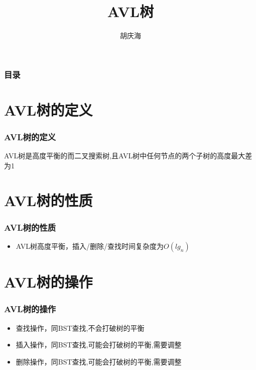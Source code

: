 \documentclass{beamer}
\begin{document}
\begin{CJK}{UTF8}{gbsn}     %

	\title{AVL树}
	\author{胡庆海}
	\date{}

    \begin{frame}
		\titlepage
    \end{frame}

    \begin{frame}
        \frametitle{目录}
		\tableofcontents
    \end{frame}

	\section{AVL树的定义}
	\begin{frame}
		\frametitle{AVL树的定义}
		AVL树是高度平衡的而二叉搜索树,且AVL树中任何节点的两个子树的高度最大差为1
	\end{frame}

	\section{AVL树的性质}
	\begin{frame}
		\frametitle{AVL树的性质}
		\begin{itemize}
			\item AVL树高度平衡，插入/删除/查找时间复杂度为$O(lg_n)$
		\end{itemize}
	\end{frame}

	\section{AVL树的操作}
	\begin{frame}
		\frametitle{AVL树的操作}
		\begin{itemize}
			\item 查找操作，同BST查找,不会打破树的平衡
			\item 插入操作，同BST查找,可能会打破树的平衡,需要调整
			\item 删除操作，同BST查找,可能会打破树的平衡,需要调整
		\end{itemize}
	\end{frame}


\end{CJK}
\end{document}
